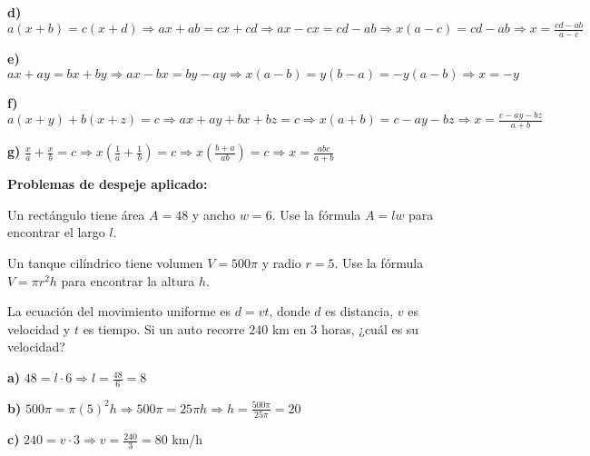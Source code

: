 \begin{exercise}
\begin{solucion}
\textbf{d)} $a(x + b) = c(x + d) \Rightarrow ax + ab = cx + cd \Rightarrow ax - cx = cd - ab \Rightarrow x(a - c) = cd - ab \Rightarrow x = \frac{cd - ab}{a - c}$

\textbf{e)} $ax + ay = bx + by \Rightarrow ax - bx = by - ay \Rightarrow x(a - b) = y(b - a) = -y(a - b) \Rightarrow x = -y$

\textbf{f)} $a(x + y) + b(x + z) = c \Rightarrow ax + ay + bx + bz = c \Rightarrow x(a + b) = c - ay - bz \Rightarrow x = \frac{c - ay - bz}{a + b}$

\textbf{g)} $\frac{x}{a} + \frac{x}{b} = c \Rightarrow x\left(\frac{1}{a} + \frac{1}{b}\right) = c \Rightarrow x\left(\frac{b + a}{ab}\right) = c \Rightarrow x = \frac{abc}{a + b}$
\end{solucion}
\end{exercise}

\begin{exercise}
\problem \textbf{Problemas de despeje aplicado:}

\begin{exerciselist}
    \item Un rectángulo tiene área $A = 48$ y ancho $w = 6$. Use la fórmula $A = lw$ para encontrar el largo $l$.

    \item Un tanque cilíndrico tiene volumen $V = 500\pi$ y radio $r = 5$. Use la fórmula $V = \pi r^2 h$ para encontrar la altura $h$.

    \item La ecuación del movimiento uniforme es $d = vt$, donde $d$ es distancia, $v$ es velocidad y $t$ es tiempo. Si un auto recorre $240$ km en $3$ horas, ¿cuál es su velocidad?
\end{exerciselist}

\begin{solucion}
\textbf{a)} $48 = l \cdot 6 \Rightarrow l = \frac{48}{6} = 8$

\textbf{b)} $500\pi = \pi (5)^2 h \Rightarrow 500\pi = 25\pi h \Rightarrow h = \frac{500\pi}{25\pi} = 20$

\textbf{c)} $240 = v \cdot 3 \Rightarrow v = \frac{240}{3} = 80$ km/h
\end{solucion}
\end{exercise}